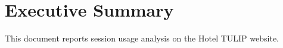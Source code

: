 \section*{Executive Summary}

This document reports session usage analysis on the Hotel TULIP website.